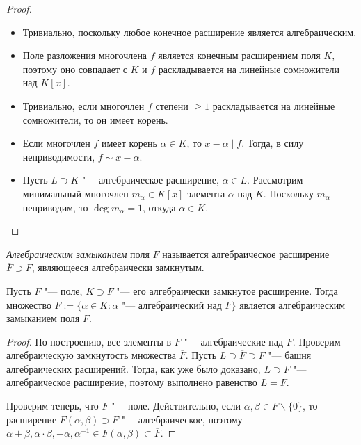 \begin{proof}~
	\begin{itemize}
		\item{}Тривиально, поскольку любое конечное расширение является алгебраическим.
		\item{}Поле разложения многочлена $f$ является конечным расширением поля $K$, поэтому оно совпадает с $K$ и $f$ раскладывается на линейные сомножители над $K[x]$.
		\item{}Тривиально, если многочлен $f$ степени $\ge 1$ раскладывается на линейные сомножители, то он имеет корень.
		\item{}Если многочлен $f$ имеет корень $\alpha \in K$, то $x - \alpha \mid f$. Тогда, в силу неприводимости, $f \sim x - \alpha$.
		\item{}Пусть $L \supset K$ "--- алгебраическое расширение, $\alpha \in L$. Рассмотрим минимальный многочлен $m_\alpha \in K[x]$ элемента $\alpha$ над $K$. Поскольку $m_\alpha$ неприводим, то $\deg{m_\alpha} = 1$, откуда $\alpha \in K$.\qedhere
	\end{itemize}
\end{proof}

\begin{definition}
	\textit{Алгебраическим замыканием} поля $F$ называется алгебраическое расширение $\overline{F} \supset F$, являющееся алгебраически замкнутым.
\end{definition}

\begin{proposition}
	Пусть $F$ "--- поле, $K \supset F$ "--- его алгебраически замкнутое расширение. Тогда множество $\overline{F} := \{\alpha \in K: \alpha\text{ "--- алгебраический над }F\}$ является алгебраическим замыканием поля $F$.
\end{proposition}

\begin{proof}
	По построению, все элементы в $\overline{F}$ "--- алгебраические над $F$. \pagebreak Проверим алгебраическую замкнутость множества $\overline{F}$. Пусть $L \supset \overline{F} \supset F$ "--- башня алгебраических расширений. Тогда, как уже было доказано, $L \supset F$ "--- алгебраическое расширение, поэтому выполнено равенство $L = \overline{F}$.
	
	Проверим теперь, что $\overline{F}$ "--- поле. Действительно, если $\alpha, \beta \in \overline{F} \backslash \{0\}$, то расширение $F(\alpha, \beta) \supset F$ "--- алгебраическое, поэтому $\alpha + \beta, \alpha \cdot \beta, -\alpha, \alpha^{-1} \in F(\alpha, \beta) \subset \overline{F}$.
\end{proof}

